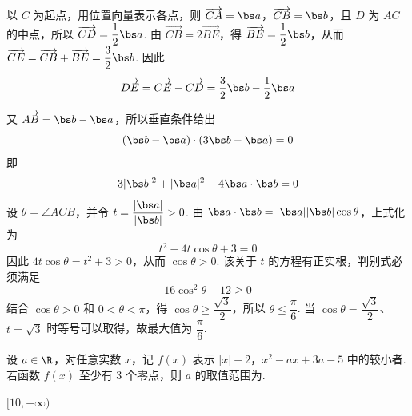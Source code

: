 \begin{solution}
以 \(C\) 为起点，用位置向量表示各点，则
\(\overrightarrow{CA}=\bs a\)，\(\overrightarrow{CB}=\bs b\)，且 \(D\) 为 \(AC\) 的中点，所以
\(\overrightarrow{CD}=\dfrac12\bs a\). 由
\(\overrightarrow{CB}=2\overrightarrow{BE}\)，得
\(\overrightarrow{BE}=\dfrac12\bs b\)，从而
\(\overrightarrow{CE}=\overrightarrow{CB}+\overrightarrow{BE}=\dfrac32\bs b\). 因此
\[
\overrightarrow{DE}=\overrightarrow{CE}-\overrightarrow{CD}
=\frac32\bs b-\frac12\bs a
\]

又 \(\overrightarrow{AB}=\bs b-\bs a\)，所以垂直条件给出
\[
(\bs b-\bs a)\cdot(3\bs b-\bs a)=0
\]
即
\[
3|\bs b|^2+|\bs a|^2-4\bs a\cdot\bs b=0
\]
设 \(\theta=\angle ACB\)，并令 \(t=\dfrac{|\bs a|}{|\bs b|}>0\). 由 \(\bs a\cdot\bs b=|\bs a||\bs b|\cos\theta\)，上式化为
\[
t^2-4t\cos\theta+3=0
\]
因此 \(4t\cos\theta=t^2+3>0\)，从而 \(\cos\theta>0\). 该关于 \(t\) 的方程有正实根，判别式必须满足
\[
16\cos^2\theta-12\geq0
\]
结合 \(\cos\theta>0\) 和 \(0<\theta<\pi\)，得
\(\cos\theta\geq\dfrac{\sqrt3}{2}\)，所以 \(\theta\leq\dfrac\pi6\). 当 \(\cos\theta=\dfrac{\sqrt3}{2}\)、\(t=\sqrt3\) 时等号可以取得，故最大值为 \(\dfrac\pi6\).
\end{solution}

\begin{problem}
设 \(a\in\R\)，对任意实数 \(x\)，记 \(f(x)\) 表示 \(|x|-2\)，\(x^2-ax+3a-5\) 中的较小者. 若函数 \(f(x)\) 至少有 3 个零点，则 \(a\) 的取值范围为\fillinblank{}.
\end{problem}

\begin{answer}
\([10,+\infty)\)
\end{answer}

